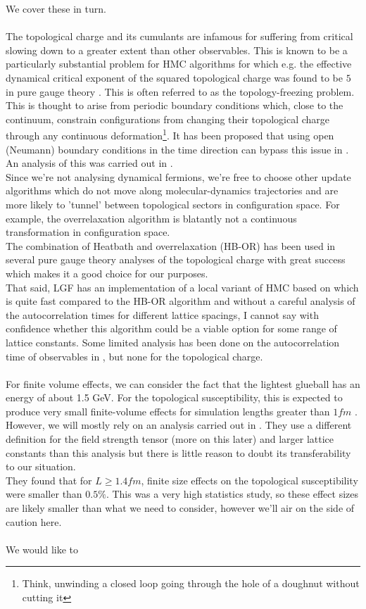 \documentclass[a4paper,10pt]{article}
\begin{document}
We cover these in turn.\\\\The topological charge and its cumulants are infamous for suffering from critical slowing down to a greater extent than other observables. This is known to be a particularly substantial problem for HMC algorithms for which e.g. the effective dynamical critical exponent of the squared topological charge was found to be $5$ in pure gauge theory \cite{2011}. This is often referred to as the topology-freezing problem. This is thought to arise from periodic boundary conditions which, close to the continuum, constrain configurations from changing their topological charge through any continuous deformation\footnote{Think, unwinding a closed loop going through the hole of a doughnut without cutting it}. It has been proposed that using open (Neumann) boundary conditions in the time direction can bypass this issue in \cite{L_scher_2011}. An analysis of this was carried out in \cite{PhysRevD.90.074502}.\\Since we're not analysing dynamical fermions, we're free to choose other update algorithms which do not move along molecular-dynamics trajectories and are more likely to 'tunnel' between topological sectors in configuration space. For example, the overrelaxation algorithm is blatantly not a continuous transformation in configuration space.\\The combination of Heatbath and overrelaxation (HB-OR) has been used in several pure gauge theory analyses of the topological charge \cite{non_gaussianities2015} \cite{PhysRevD.92.094518} with great success which makes it a good choice for our purposes.\\That said, LGF has an implementation of a local variant of HMC based on \cite{Kennedy_1994} which is quite fast compared to the HB-OR algorithm and without a careful analysis of the autocorrelation times for different lattice spacings, I cannot say with confidence whether this algorithm could be a viable option for some range of lattice constants. Some limited analysis has been done on the autocorrelation time of observables in \cite{LHMC_autocorr}, but none for the topological charge.\\\\For finite volume effects, we can consider the fact that the lightest glueball has an energy of about 1.5 GeV. For the topological susceptibility, this is expected to produce very small finite-volume effects for simulation lengths greater than $1fm$ \cite{Del_Debbio_2005}. However, we will mostly rely on an analysis carried out in \cite{non_gaussianities2015}. They use a different definition for the field strength tensor (more on this later) and larger lattice constants than this analysis but there is little reason to doubt its transferability to our situation.\\They found that for $L\geq 1.4fm$, finite size effects on the topological susceptibility were smaller than  $0.5\%$. This was a very high statistics study, so these effect sizes are likely smaller than what we need to consider, however we'll air on the side of caution here.\\\\We would like to 
\end{document}
